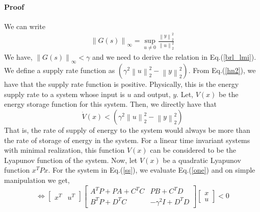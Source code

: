 \documentclass[a4paper,12pt]{article}
\newcommand\norm[1]{\left\lVert#1\right\rVert}
\begin{document}
		\paragraph{Proof} We can write 
		\begin{align}
		\norm{G(s)}_{\infty} = \sup_{u\neq0} \frac{\norm{y}_{2}^{2}}{\norm{u}_{2}^{2}}
		\label{hn2}
		\end{align} 
		We have, $\norm{G(s)}_{\infty}<\gamma$ and we need to derive the relation in Eq.(\ref{brl_lmi}). We define a supply rate function as $(\gamma^{2}\norm{u}_{2}^{2} - \norm{y}_{2}^{2})$. From Eq.(\ref{hn2}), we have that the supply rate function is positive. Physically, this is the energy supply rate to a system whose input is $u$ and output, $y$. Let, $V(x)$ be the energy storage function for this system. Then, we directly have that
		\begin{equation}
			\dot{V}(x) < (\gamma^{2}\norm{u}_{2}^{2} - \norm{y}_{2}^{2})
			\label{one} 
		\end{equation}		 
		That is, the rate of supply of energy to the system would always be more than the rate of storage of energy in the system. For a linear time invariant systems with minimal realization, this function $V(x)$ can be considered to be the Lyapunov function of the system. Now, let $V(x)$ be a quadratic Lyapunov function $x^{T}Px$. For the system in Eq.(\ref{ss}), we evaluate Eq.(\ref{one}) and on simple manipulation we get,\\
		
		\[
		\Leftrightarrow
		\begin{bmatrix}
		x^{T} & u^{T}
		\end{bmatrix}
		\begin{bmatrix}
		A^{T}P+PA+C^{T}C & PB+C^{T}D \\
		B^{T}P+D^{T}{C} & -\gamma^{2} I + D^{T}D
		\end{bmatrix}
		\begin{bmatrix}
		x \\ u
		\end{bmatrix}
		<0
		\]
		\\
		
\end{document}
